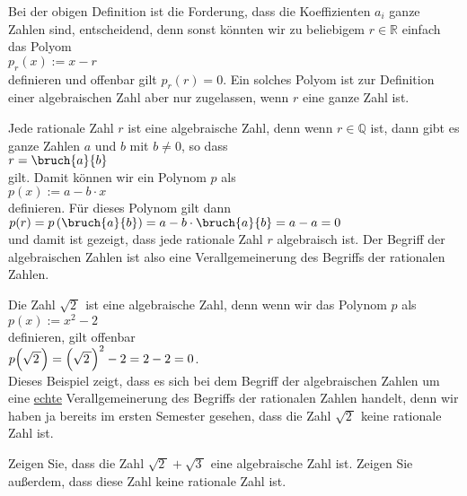 Bei der obigen Definition ist die Forderung, dass die Koeffizienten $a_i$ ganze Zahlen sind, entscheidend,
denn sonst k\"onnten wir zu beliebigem $r \in \mathbb{R}$ einfach das Polyom
\\[0.2cm]
\hspace*{1.3cm}
$p_r(x) := x - r$
\\[0.2cm]
definieren und offenbar gilt $p_r(r) = 0$.  Ein solches Polyom ist zur Definition einer algebraischen
Zahl aber nur zugelassen, wenn $r$ eine ganze Zahl ist. \eod

\example
Jede rationale Zahl $r$ ist eine algebraische Zahl, denn wenn $r \in \mathbb{Q}$ ist, dann gibt es
ganze Zahlen $a$ und $b$ mit $b \not= 0$, so dass
\\[0.2cm]
\hspace*{1.3cm}
$r = \bruch{a}{b}$
\\[0.2cm]
gilt.  Damit k\"onnen wir ein Polynom $p$ als
\\[0.2cm]
\hspace*{1.3cm}
$p(x) := a - b \cdot x$
\\[0.2cm]
definieren.  F\"ur dieses Polynom gilt dann
\\[0.2cm]
\hspace*{1.3cm}
$p(r) = p\left(\bruch{a}{b}\right) = a - b \cdot \bruch{a}{b} = a - a = 0$
\\[0.2cm]
und damit ist gezeigt, dass jede rationale Zahl $r$ algebraisch ist.  Der Begriff der algebraischen
Zahlen ist also eine Verallgemeinerung des Begriffs der rationalen Zahlen.  \eod

\example
Die Zahl $\sqrt{2\,}$ ist eine algebraische Zahl, denn wenn wir das Polynom $p$ als
\\[0.2cm]
\hspace*{1.3cm}
$p(x) := x^2 - 2$
\\[0.2cm]
definieren, gilt offenbar
\\[0.2cm]
\hspace*{1.3cm}
$p\Bigl(\sqrt{2\,}\Bigr) = \Bigl(\sqrt{2\,}\Bigr)^2 - 2 = 2 - 2 = 0$.  
\\[0.2cm]
Dieses Beispiel zeigt, dass es sich bei dem Begriff der algebraischen Zahlen um eine \underline{echte} 
Verallgemeinerung des Begriffs der rationalen Zahlen handelt, denn wir haben ja bereits im ersten
Semester gesehen, dass die Zahl $\sqrt{2\,}$ keine rationale Zahl ist.
\eod

\exercises
Zeigen Sie, dass die Zahl $\sqrt{2\,} + \sqrt{3\,}$ eine algebraische Zahl ist.  Zeigen Sie au{\ss}erdem,
dass diese Zahl keine rationale Zahl ist.  \eox

